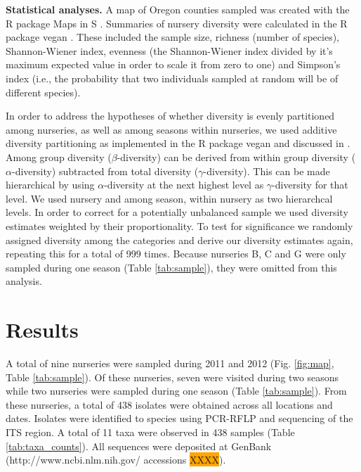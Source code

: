 \documentclass[12pt]{article}
\begin{document}
\textbf{Statistical analyses.} A map of Oregon counties sampled was created with the R \cite{R} package Maps in S \cite{r_maps}.  Summaries of nursery diversity were calculated in the R \cite{R} package vegan \cite{vegan}.  These included the sample size, richness (number of species), Shannon-Wiener index, evenness (the Shannon-Wiener index divided by it's maximum expected value in order to scale it from zero to one) and Simpson's index (i.e., the probability that two individuals sampled at random will be of different species).

In order to address the hypotheses of whether diversity is evenly partitioned among nurseries, as well as among seasons within nurseries, we used additive diversity partitioning as implemented in the R package vegan \cite{vegan} and discussed in \cite{lande_1996, christ_etal_2003}.  Among group diversity ($\beta$-diversity) can be derived from within group diversity ($\alpha$-diversity) subtracted from total diversity ($\gamma$-diversity).  This can be made hierarchical by using $\alpha$-diversity at the next highest level as $\gamma$-diversity for that level.  We used nursery and among season, within nursery as two hierarchcal levels.  In order to correct for a potentially unbalanced sample we used diversity estimates weighted by their proportionality.  To test for significance we randomly assigned diversity among the categories and derive our diversity estimates again, repeating this for a total of 999 times.  Because nurseries B, C and G were only sampled during one season (Table \ref{tab:sample}), they were omitted from this analysis.


\section*{\sffamily\normalsize{Results}}

A total of nine nurseries were sampled during 2011 and 2012 (Fig. \ref{fig:map}, Table \ref{tab:sample}).  Of these nurseries, seven were visited during two seasons while two nurseries were sampled during one season (Table \ref{tab:sample}).  From these nurseries, a total of 438 isolates were obtained across all locations and dates.  Isolates were identified to species using PCR-RFLP and sequencing of the ITS region. A total of 11 taxa were observed in 438 samples (Table \ref{tab:taxa_counts}).  All sequences were deposited at GenBank (http://www.ncbi.nlm.nih.gov/ accessions \colorbox{orange}{XXXX}).
\end{document}

